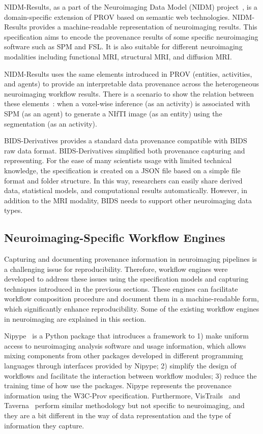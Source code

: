 NIDM-Results, as a part of the Neuroimaging 
Data Model (NIDM) project~\cite{nidm-results}, is a domain-specific 
extension of PROV based on semantic web technologies. NIDM-Results 
provides a machine-readable representation of neuroimaging results.
This specification aims to encode the provenance results of some specific
neuroimaging software such as SPM and FSL. It is also suitable for different
neuroimaging modalities including functional MRI, structural MRI, and diffusion MRI.

NIDM-Results uses the same elements introduced in PROV (entities, 
activities, and agents) to provide an interpretable data provenance 
across the heterogeneous neuroimaging workflow results. There is a 
scenario to show the relation between these 
elements~\cite{maumet2016sharing}: when a voxel-wise inference (as an 
activity) is associated with SPM (as an agent) to generate a NIfTI 
image (as an entity) using the segmentation (as an activity).

BIDS-Derivatives provides a standard data provenance compatible with 
BIDS~\cite{gorgolewski2016brain} raw data format. BIDS-Derivatives 
simplified both provenance capturing and representing. For the ease of 
many scientists usage with limited technical knowledge, the 
specification is created on a JSON file based on a simple file format 
and folder structure. In this way, researchers can easily share derived 
data, statistical models, and computational results automatically. 
However, in addition to the MRI modality, BIDS needs to support other 
neuroimaging data types.


\subsection{Neuroimaging-Specific Workflow Engines} 

Capturing and documenting provenance information in neuroimaging 
pipelines is a challenging issue for reproducibility. 
Therefore, workflow engines were developed to address these issues using 
the specification models and capturing techniques introduced in the 
previous sections. These engines can facilitate workflow composition 
procedure and document them in a machine-readable form, which 
significantly enhance reproducibility. Some of the existing workflow 
engines in neuroimaging are explained in this section. 

Nipype~\cite{gorgolewski2011nipype} is a Python package that 
introduces a framework to 1) make uniform access to neuroimaging 
analysis software and usage information, which allows mixing components 
from other packages developed in different programming languages through 
interfaces provided by Nipype; 2) simplify the design of workflows and 
facilitate the interaction between workflow modules; 3) reduce the 
training time of how use the packages. Nipype represents the provenance 
information using the W3C-Prov specification. Furthermore, 
VisTrails~\cite{callahan2006vistrails} and 
Taverna~\cite{oinn2004taverna} perform similar methodology but not 
specific to neuroimaging, and they are a bit different in the way of 
data representation and the type of information they capture. 

